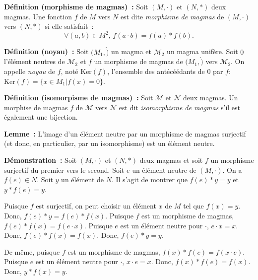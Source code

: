     \done

\medskip

\noindent\textbf{Définition (morphisme de magmas) :} Soit $\left(M, \cdot \right)$ et $\left(N, \ast \right)$ deux magmas.
    Une fonction $f$ de $M$ vers $N$ est dite \textit{morphisme de magmas} de $\left(M, \cdot \right)$ vers $\left(N, \ast \right)$ si elle satisfait : 
    \begin{equation*}
        \forall (a,b) \in M^2, \, f (a \cdot b) = f(a) \ast f(b) .
    \end{equation*}

\medskip

\noindent\textbf{Définition (noyau) :} Soit $(M_1, \dot)$ un magma et $\mathcal{M}_2$ un magma unifère.  
    Soit $0$ l'élément neutres de $\mathcal{M}_2$ et $f$ un morphisme de magmas de $(M_1, \dot)$ vers $\mathcal{M}_2$.
    On appelle \emph{noyau} de $f$, noté $\mathrm{Ker}(f)$, l'ensemble des antécéédants de $0$ par $f$: $\mathrm{Ker}(f) = \lbrace x \in M_1 \vert f(x) = 0 \rbrace$.

\medskip

\noindent\textbf{Définition (isomorpisme de magmas) :} Soit $\mathcal{M}$ et $\mathcal{N}$ deux magmas.
    Un morphise de magmas $f$ de $\mathcal{M}$ vers $\mathcal{N}$ est dit \textit{isomorphisme de magmas} s'il est également une bijection.

\medskip

\noindent\textbf{Lemme :} L'image d'un élément neutre par un morphisme de magmas surjectif (et donc, en particulier, par un isomorphisme) est un élément neutre.

\medskip

\noindent\textbf{Démonstration :} Soit $\left(M, \cdot \right)$ et $\left(N, \ast \right)$ deux magmas et soit $f$ un morphisme surjectif du premier vers le second. 
    Soit $e$ un élément neutre de $\left(M, \cdot \right)$. 
    On a $f(e) \in N$. 
    Soit $y$ un élément de $N$. 
    Il s'agit de montrer que $f(e) \ast y = y$ et $y \ast f(e) = y$.

    Puisque $f$ est surjectif, on peut choisir un élément $x$ de $M$ tel que $f(x) = y$. 
    Donc, $f(e) \ast y = f(e) \ast f(x)$. 
    Puisque $f$ est un morphisme de magmas, $f(e) \ast f(x) = f(e \cdot x)$. 
    Puisque $e$ est un élément neutre pour $\cdot$, $e \cdot x = x$. 
    Donc, $f(e) \ast f(x) = f(x)$.
    Donc, $f(e) \ast y = y$. 

    De même, puisque $f$ est un morphisme de magmas, $f(x) \ast f(e) = f(x \cdot e)$. 
    Puisque $e$ est un élément neutre pour $\cdot$, $x \cdot e = x$. 
    Donc, $f(x) \ast f(e) = f(x)$.
    Donc, $y \ast f(x) = y$. 

